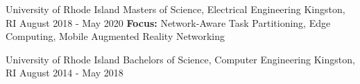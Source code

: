 \gradheader
\begin{cventries}
  \cventry
    {University of Rhode Island}
    {Masters of Science, Electrical Engineering}
    {Kingston, RI}
    {August 2018 - May 2020}
    {\textbf{Focus:} Network-Aware Task Partitioning, Edge Computing, Mobile Augmented Reality Networking}
\end{cventries}
\ugradheader
\begin{cventries}
  \cventry
  {University of Rhode Island}
  {Bachelors of Science, Computer Engineering}
  {Kingston, RI}
  {August 2014 - May 2018}
  {}
\end{cventries}
